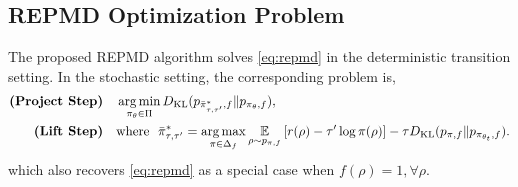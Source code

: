 \subsection{REPMD Optimization Problem}

The proposed REPMD algorithm solves \cref{eq:repmd} in the deterministic transition setting. In the stochastic setting, the corresponding problem is,
\begin{equation}
\label{eq:repmd_stochastic}
\begin{split}
\text{\bf (Project Step)} \quad &\argmin\limits_{\pi_\theta \in \Pi}{\KL(p_{\bar{\pi}_{\tau,\tau^{\prime}}^*, f}  \| p_{\pi_\theta, f} ) }, \\
\text{\bf (Lift Step)}  \quad & \text{where}\ \ \bar{\pi}_{\tau,\tau^{\prime}}^* =  \argmax\limits_{\pi \in \Delta_f}{ \ep\limits_{\rho \sim p_{\pi, f}}{ \left[ r(\rho) - \tau^{\prime} \log{\pi(\rho)} \right] } - \tau \KL(p_{\pi, f} \| p_{\pi_{\theta_t}, f} ) }. 
\end{split}
\end{equation}
which also recovers \cref{eq:repmd} as a special case when $f(\rho) = 1, \forall \rho$.

